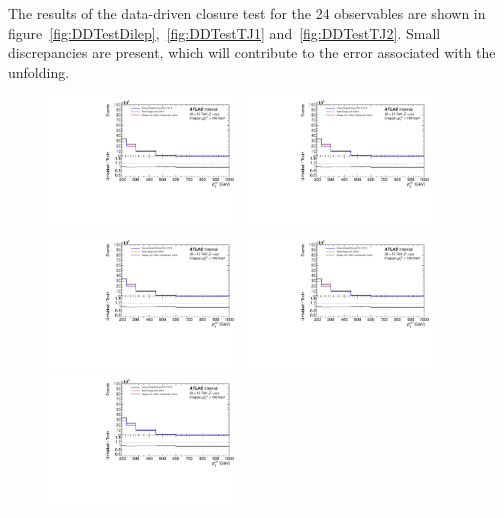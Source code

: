 The results of the data-driven closure test for the 24 observables are shown in figure~\ref{fig:DDTestDilep},~\ref{fig:DDTestTJ1} and~\ref{fig:DDTestTJ2}. Small discrepancies are present, which will contribute to the error associated with the unfolding.

\begin{figure}[h!]
  \centering
  \includegraphics[page=525,width=0.45\textwidth]{figures/IBUClosureTests.pdf}
  \includegraphics[page=531,width=0.45\textwidth]{figures/IBUClosureTests.pdf} \\
  \includegraphics[page=543,width=0.45\textwidth]{figures/IBUClosureTests.pdf}
  \includegraphics[page=549,width=0.45\textwidth]{figures/IBUClosureTests.pdf} \\
  \includegraphics[page=555,width=0.45\textwidth]{figures/IBUClosureTests.pdf}

\end{figure}
